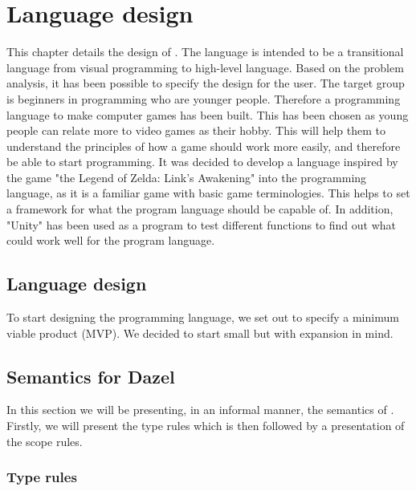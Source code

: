 \chapter{Language design}
This chapter details the design of \dazel.
The language is intended to be a transitional language from visual programming to high-level language. Based on the problem analysis, it has been possible to specify the design for the user.
The target group is beginners in programming who are younger people. Therefore a programming language to make computer games has been built. This has been chosen as young people can relate more to video games as their hobby. 
This will help them to understand the principles of how a game should work more easily, and therefore be able to start programming. 
It was decided to develop a language inspired by the game "the Legend of Zelda: Link’s Awakening" into the programming language, as it is a familiar game with basic game terminologies.
This helps to set a framework for what the program language should be capable of.
In addition, "Unity" has been used as a program to test different functions to find out what could work well for the program language.



\section{Language design}

To start designing the programming language, we set out to specify a minimum viable product (MVP). We decided to start small but with expansion in mind.












\section{Semantics for Dazel}

In this section we will be presenting, in an informal manner, the semantics of \dazel. Firstly, we will present the type rules which is then followed by a presentation
of the scope rules.


\subsection*{Type rules}

